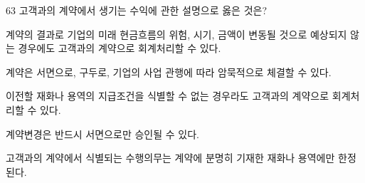 \begin{question}{63}
고객과의 계약에서 생기는 수익에 관한 설명으로 옳은 것은?
\begin{choices}
  \item 계약의 결과로 기업의 미래 현금흐름의 위험, 시기, 금액이 변동될 것으로 예상되지 않는 경우에도 고객과의 계약으로 회계처리할 수 있다.
  \item 계약은 서면으로, 구두로, 기업의 사업 관행에 따라 암묵적으로 체결할 수 있다.
  \item 이전할 재화나 용역의 지급조건을 식별할 수 없는 경우라도 고객과의 계약으로 회계처리할 수 있다.
  \item 계약변경은 반드시 서면으로만 승인될 수 있다.
  \item 고객과의 계약에서 식별되는 수행의무는 계약에 분명히 기재한 재화나 용역에만 한정된다.
\end{choices}
\end{question}
